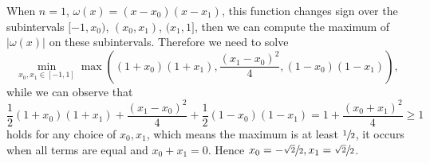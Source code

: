 \begin{example}
    When $n = 1$, $\omega(x) = (x - x_0)(x - x_1)$, this function changes sign over the subintervals $[-1, x_0)$, $(x_0, x_1)$, $(x_1, 1]$, then we can compute the maximum of $|\omega(x)|$ on these subintervals. Therefore we need to solve 
    \begin{equation}
        \min_{x_0, x_1\in [-1,1]}\max((1 + x_0)(1 + x_1), \frac{(x_1-x_0)^2}{4}, (1 - x_0)(1 - x_1) ),
    \end{equation}
    while we can observe that 
    \begin{equation}
       \frac{1}{2} (1 + x_0)(1 + x_1) +  \frac{(x_1-x_0)^2}{4} + \frac{1}{2}(1 - x_0)(1 - x_1) = 1 + \frac{(x_0 + x_1)^2}{4}\ge 1
    \end{equation}
    holds for any choice of $x_0, x_1$, which means the maximum is at least $\sfrac{1}{2}$, it occurs when all terms are equal and $x_0 + x_1 = 0$. Hence $x_0 = -\sfrac{\sqrt{2}}{2}, x_1 = \sfrac{\sqrt{2}}{2}$.
\end{example}

